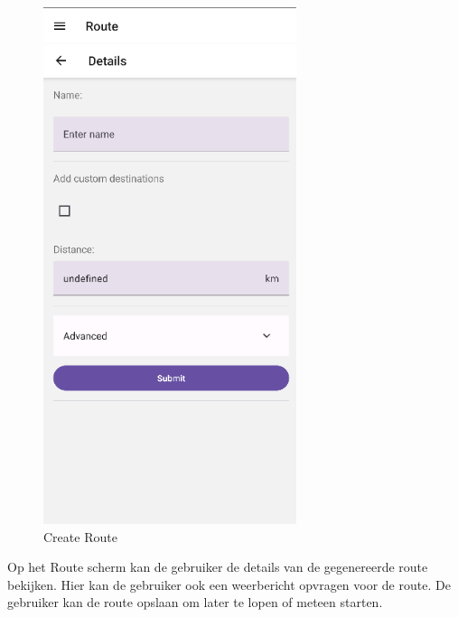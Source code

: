     \begin{figure}[H]
        \includegraphics[width=20em]{./graphics/create.png}
        \centering
        \caption{Create Route}
        \label{fig:createRoute}
    \end{figure}

    Op het Route scherm kan de gebruiker de details van de gegenereerde route bekijken. Hier kan de gebruiker ook een weerbericht opvragen voor de route. De gebruiker kan de route opslaan om later te lopen of meteen starten.

